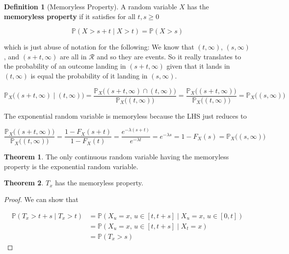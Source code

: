 \documentclass{article}
\theoremstyle{definition}
\newtheorem{theorem}{Theorem}[section]
\theoremstyle{remark}
\theoremstyle{definition}
\newtheorem{definition}{Definition}[section]
\begin{document}
      \begin{definition}[Memoryless Property]
        A random variable $X$ has the \textbf{memoryless property} if it satisfies for all $t, s \geq 0$ 

          \[\mathbb{P}(X > s + t \mid X > t) = \mathbb{P}(X > s)\]

        which is just abuse of notation for the following: We know that $(t, \infty)$, $(s, \infty)$, and $(s + t, \infty)$ are all in $\mathcal{R}$ and so they are events. So it really translates to the probability of an outcome landing in $(s + t, \infty)$ given that it lands in $(t, \infty)$ is equal the probability of it landing in $(s, \infty)$. 

          \[\mathbb{P}_X \big( (s + t, \infty) \mid (t, \infty) \big) = \frac{\mathbb{P}_X \big( (s + t, \infty) \cap (t, \infty) \big)}{\mathbb{P}_X \big( (t, \infty) \big)} = \frac{\mathbb{P}_X \big( (s + t, \infty) \big)}{\mathbb{P}_X \big( (t, \infty) \big)} = \mathbb{P}_X \big( (s, \infty) \big)\]
      \end{definition}

      The exponential random variable is memoryless because the LHS just reduces to 

        \[\frac{\mathbb{P}_X \big( (s + t, \infty) \big)}{\mathbb{P}_X \big( (t, \infty) \big)} = \frac{1 - F_X (s + t)}{1 - F_X (t)} = \frac{e^{-\lambda(s + t)}}{e^{-\lambda t}} = e^{-\lambda s} = 1 - F_X (s) = \mathbb{P}_X \big( (s, \infty) \big) \]

      \begin{theorem}
        The only continuous random variable having the memoryless property is the exponential random variable. 
      \end{theorem}

      \begin{theorem}
        $T_x$ has the memoryless property. 
      \end{theorem}
      \begin{proof}
        We can show that 

        \begin{align*}
          \mathbb{P}(T_x > t + s \mid T_x > t) & = \mathbb{P}(X_u = x, \, u \in [t, t + s] \mid X_u = x, \, u \in [0, t]) \\
          & = \mathbb{P}(X_u = x, \, u \in [t, t + s] \mid X_t = x) \\
          & = \mathbb{P}(T_x > s) 
        \end{align*}
      \end{proof}
\end{document}
